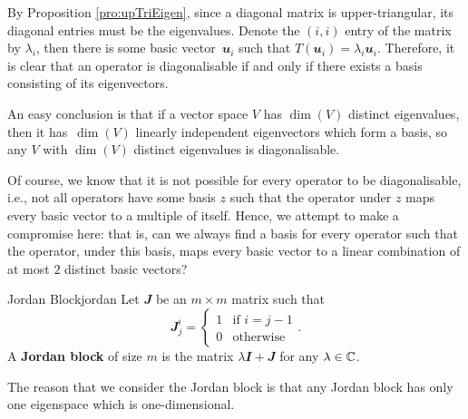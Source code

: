 \documentclass[math]{amznotes}
\theoremstyle{remark}
\begin{document}
By Proposition \ref{pro:upTriEigen}, since a diagonal matrix is upper-triangular, its diagonal entries must be the eigenvalues. Denote the $(i, i)$ entry of the matrix by $\lambda_i$, then there is some basic vector~$\mathbfit{u}_i$ such that $T(\mathbfit{u}_i) = \lambda_i\mathbfit{u}_i$. Therefore, it is clear that an operator is diagonalisable if and only if there exists a basis consisting of its eigenvectors.

An easy conclusion is that if a vector space $V$ has $\dim(V)$ distinct eigenvalues, then it has~$\dim(V)$ linearly independent eigenvectors which form a basis, so any $V$ with $\dim(V)$ distinct eigenvalues is diagonalisable.

Of course, we know that it is not possible for every operator to be diagonalisable, i.e., not all operators have some basis $z$ such that the operator under $z$ maps every basic vector to a multiple of itself. Hence, we attempt to make a compromise here: that is, can we always find a basis for every operator such that the operator, under this basis, maps every basic vector to a linear combination of at most $2$ distinct basic vectors?
\begin{dfnbox}{Jordan Block}{jordan}
    Let $\mathbfit{J}$ be an $m \times m$ matrix such that 
    \begin{equation*}
        \mathbfit{J}^i_j = \begin{cases}
            1 & \textrm{if } i = j - 1 \\
            0 & \textrm{otherwise}
        \end{cases}.
    \end{equation*}
    A {\color{red} \textbf{Jordan block}} of size $m$ is the matrix $\lambda\mathbfit{I} + \mathbfit{J}$ for any $\lambda \in \mathbb{C}$.
\end{dfnbox}
The reason that we consider the Jordan block is that any Jordan block has only one eigenspace which is one-dimensional.
\end{document}

